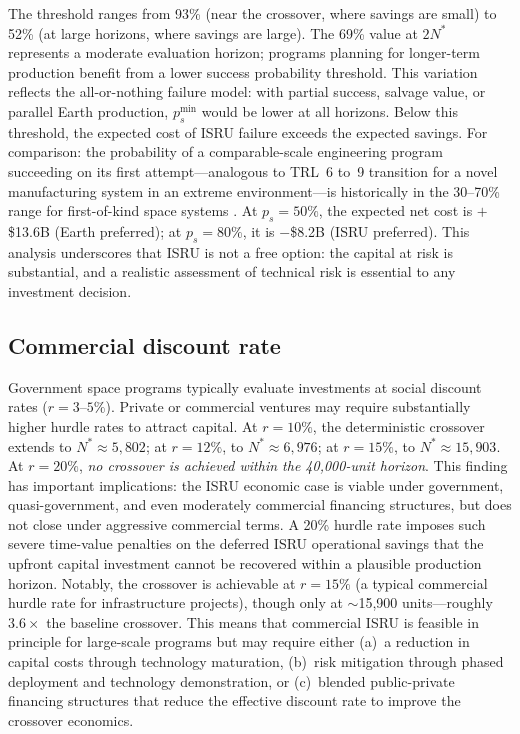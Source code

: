 \documentclass[preprint,12pt]{elsarticle}
\begin{document}
The threshold ranges from 93\% (near the crossover, where savings are small) to 52\% (at large horizons, where savings are large). The 69\% value at $2N^*$ represents a moderate evaluation horizon; programs planning for longer-term production benefit from a lower success probability threshold. This variation reflects the all-or-nothing failure model: with partial success, salvage value, or parallel Earth production, $p_s^{\min}$ would be lower at all horizons. Below this threshold, the expected cost of ISRU failure exceeds the expected savings. For comparison: the probability of a comparable-scale engineering program succeeding on its first attempt---analogous to TRL~6 to~9 transition for a novel manufacturing system in an extreme environment---is historically in the 30--70\% range for first-of-kind space systems \cite{wertz2011}. At $p_s = 50\%$, the expected net cost is $+$\$13.6B (Earth preferred); at $p_s = 80\%$, it is $-$\$8.2B (ISRU preferred). This analysis underscores that ISRU is not a free option: the capital at risk is substantial, and a realistic assessment of technical risk is essential to any investment decision.

\subsection{Commercial discount rate}
\label{sec:commercial_rate}

Government space programs typically evaluate investments at social discount rates ($r = 3$--$5\%$). Private or commercial ventures may require substantially higher hurdle rates to attract capital. At $r = 10\%$, the deterministic crossover extends to $N^* \approx 5{,}802$; at $r = 12\%$, to $N^* \approx 6{,}976$; at $r = 15\%$, to $N^* \approx 15{,}903$. At $r = 20\%$, \emph{no crossover is achieved within the 40{,}000-unit horizon}. This finding has important implications: the ISRU economic case is viable under government, quasi-government, and even moderately commercial financing structures, but does not close under aggressive commercial terms. A 20\% hurdle rate imposes such severe time-value penalties on the deferred ISRU operational savings that the upfront capital investment cannot be recovered within a plausible production horizon. Notably, the crossover is achievable at $r = 15\%$ (a typical commercial hurdle rate for infrastructure projects), though only at $\sim$15{,}900 units---roughly $3.6\times$ the baseline crossover. This means that commercial ISRU is feasible in principle for large-scale programs but may require either (a)~a reduction in capital costs through technology maturation, (b)~risk mitigation through phased deployment and technology demonstration, or (c)~blended public-private financing structures that reduce the effective discount rate to improve the crossover economics.
\end{document}
